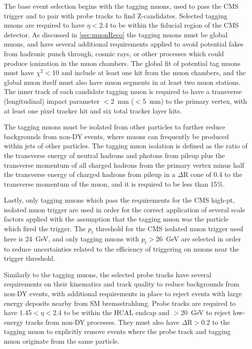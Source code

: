 The base event selection begins with the tagging muons, used to pass the CMS trigger and to pair with probe tracks to find Z-candidates.
Selected tagging muons are required to have $\eta<$2.4 to be within the fiducial region of the CMS detector. 
As discussed in \cref{sec:muonReco} the tagging muons must be global muons, and have several additional requirements applied to avoid potential fakes from hadronic punch through, cosmic rays, or other processes which could produce ionization in the muon chambers.
The global fit of potential tag muons must have $\chi^2<$10 and include at least one hit from the muon chambers, and the global muon itself must also have muon segments in at least two muon stations.
The inner track of each candidate tagging muon is required to have a transverse (longitudinal) impact parameter $<$\SI{2}{\milli\meter} ($<$\SI{5}{\milli\meter}) to the primary vertex, with at least one pixel tracker hit and six total tracker layer hits.

The tagging muons must be isolated from other particles to further reduce backgrounds from non-DY events, where muons can frequently be produced within jets of other particles.
The tagging muon isolation is defined as the ratio of the transverse energy of neutral hadrons and photons from pileup plus the transverse momentum of all charged hadrons from the primary vertex minus half the transverse energy of charged hadrons from pileup in a $\Delta$R cone of 0.4 to the transverse momentum of the muon, and it is required to be less than 15$\%$.

Lastly, only tagging muons which pass the requirements for the CMS high-pt, isolated muon trigger are used in order for the correct application of several scale factors applied with the assumption that the tagging muon was the particle which fired the trigger.
The $p_t$ threshold for the CMS isolated muon trigger used here is \SI{24}{\giga\eV}, and only tagging muons with $p_t>$\SI{26}{\giga\eV} are selected in order to reduce uncertainties related to the efficiency of triggering on muons near the trigger threshold.

Similarly to the tagging muons, the selected probe tracks have several requirements on their kinematics and track quality to reduce backgrounds from non-DY events, with additional requirements in place to reject events with large energy deposits nearby from SM bremsstrahlung.
Probe tracks are required to have 1.45$<\eta<$2.4 to be within the HCAL endcap and \pt$>$\SI{20}{\giga\eV} to reject low-energy tracks from non-DY processes.
They must also have $\Delta\mathrm{R}>$0.2 to the tagging muon to explicitly remove events where the probe track and tagging muon originate from the same particle.

